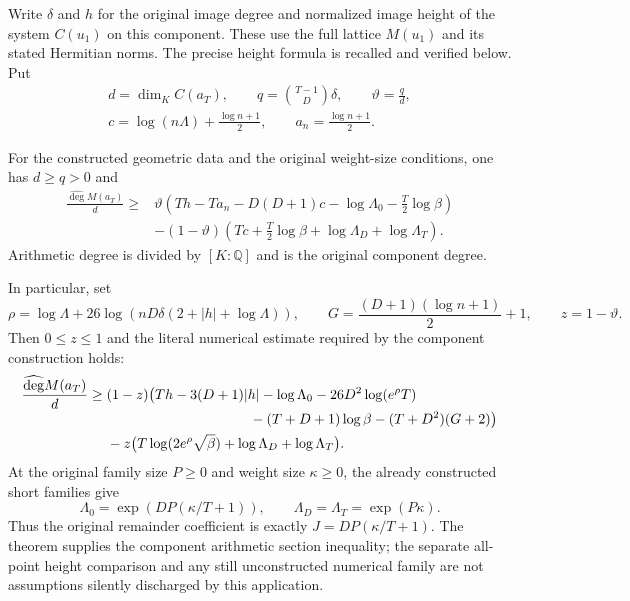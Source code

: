 Write $\delta$ and $h$ for the original image degree and normalized
image height of the system $C(u_1)$ on this component.  These use
the full lattice $M(u_1)$ and its stated Hermitian norms.  The precise
height formula is recalled and verified below.  Put
\begin{gather*}
 d=\dim_K C(a_T),\qquad
 q=\binom{T-1}{D}\delta,\qquad \vartheta=\frac qd,\\
 c=\log(n\Lambda)+\frac{\log n+1}{2},\qquad
 a_n=\frac{\log n+1}{2}.
\end{gather*}

\begin{theorem}
\label{thm:actual-component-section-degree}
For the constructed geometric data and the original weight-size
conditions, one has $d\ge q>0$ and
\begin{equation}\label{eq:actual-component-section-strong}
\begin{split}
\frac{\widehat{\deg} M(a_T)}d\ge{}&
 \vartheta\left(Th-Ta_n-D(D+1)c-\log\Lambda_0
                                      -\frac T2\log\beta\right)\\
&-(1-\vartheta)\left(Tc+\frac T2\log\beta
                             +\log\Lambda_D+\log\Lambda_T\right).
\end{split}
\end{equation}
Arithmetic degree is divided by $[K:\mathbb Q]$ and is the original
component degree.

In particular, set
\[
 \rho=\log\Lambda+
 26\log\!\left(nD\delta(2+|h|+\log\Lambda)\right),
 \qquad G=\frac{(D+1)(\log n+1)}2+1,\qquad z=1-\vartheta .
\]
Then $0\le z\le1$ and the literal numerical estimate required by
the component construction holds:
\begin{equation}\label{eq:actual-component-section-original}
\begin{split}
\frac{\widehat{\deg}M(a_T)}d\ge{}&
(1-z)\bigl(Th-3(D+1)|h|-\log\Lambda_0
 -26D^2\log(e^\rho T)\\[-2pt]
&\hspace{36mm}-(T+D+1)\log\beta-(T+D^2)(G+2)\bigr)\\
&-z\bigl(T\log(2e^\rho\sqrt\beta)
                              +\log\Lambda_D+\log\Lambda_T\bigr).
\end{split}
\end{equation}
At the original family size $P\ge0$ and weight size $\kappa\ge0$, the already
constructed short families give
\[
 \Lambda_0=\exp\!\left(DP(\kappa/T+1)\right),\qquad
 \Lambda_D=\Lambda_T=\exp(P\kappa).
\]
Thus the original remainder coefficient is exactly
$J=DP(\kappa/T+1)$.  The theorem supplies the component arithmetic
section inequality; the separate all-point height comparison and
any still unconstructed numerical family are not assumptions
silently discharged by this application.
\end{theorem}

